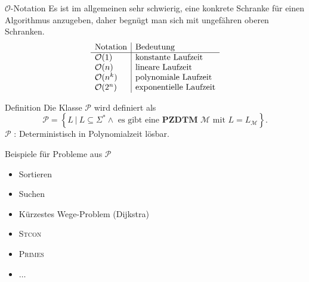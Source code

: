 \documentclass[]{beamer}
\begin{document}
\begin{frame}[squeeze]{}
  \begin{block}{$\mathcal{O}$-Notation}
    Es ist im allgemeinen sehr schwierig, eine konkrete Schranke für einen Algorithmus anzugeben, daher begnügt man sich mit ungefähren oberen Schranken.
    \[\begin{array}{l | l}
      \text{Notation}  & \text{Bedeutung} \\
      \hline
      \mathcal{O}(1)   & \text{konstante Laufzeit} \\
      \mathcal{O}(n)   & \text{lineare Laufzeit} \\
      \mathcal{O}(n^k) & \text{polynomiale Laufzeit} \\
      \mathcal{O}(2^n) & \text{exponentielle Laufzeit} \\
    \end{array}\]
  \end{block}
\end{frame}

\begin{frame}[squeeze]{}
  \begin{block}{Definition}
    Die Klasse $\mathcal{P}$ wird definiert als
    \[\mathcal{P} = \left\{L \ | \ L \subseteq \Sigma^* \wedge \text{ es gibt eine } \textbf{PZDTM } \mathcal{M} \text{ mit } L = L_\mathcal{M} \right\}.\]
    $\mathcal{P}$ : Deterministisch in Polynomialzeit lösbar.
  \end{block}
  
  \pause
  
  \begin{exampleblock}{Beispiele für Probleme aus $\mathcal{P}$}
    \begin{itemize}
      \item Sortieren
      \item Suchen
      \item Kürzestes Wege-Problem (Dijkstra)
      \item \textsc{Stcon}
      \item \textsc{Primes}
      \item $\ldots$
    \end{itemize}
  \end{exampleblock}
\end{frame}
\end{document}
